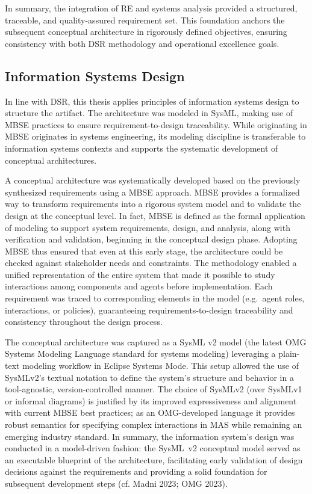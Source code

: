 In summary, the integration of RE and systems analysis provided a structured, traceable, and quality-assured requirement set. This foundation anchors the subsequent conceptual architecture in rigorously defined objectives, ensuring consistency with both DSR methodology and operational excellence goals.

\subsection{Information Systems Design}\label{subsec:isd}
In line with DSR, this thesis applies principles of information systems design to structure the artifact. The architecture was modeled in SysML, making use of MBSE practices to ensure requirement-to-design traceability. While originating in MBSE originates in systems engineering, its modeling discipline is transferable to information systems contexts and supports the systematic development of conceptual architectures.

A conceptual architecture was systematically developed based on the previously synthesized requirements using a MBSE approach. MBSE provides a formalized way to transform requirements into a rigorous system model and to validate the design at the conceptual level. In fact, MBSE is defined as the formal application of modeling to support system requirements, design, and analysis, along with verification and validation, beginning in the conceptual design phase. Adopting MBSE thus ensured that even at this early stage, the architecture could be checked against stakeholder needs and constraints. The methodology enabled a unified representation of the entire system that made it possible to study interactions among components and agents before implementation. Each requirement was traced to corresponding elements in the model (e.g.~agent roles, interactions, or policies), guaranteeing requirements-to-design traceability and consistency throughout the design process.

The conceptual architecture was captured as a SysML v2 model (the latest OMG Systems Modeling Language standard for systems modeling) leveraging a plain-text modeling workflow in Eclipse Systems Mode. This setup allowed the use of SysMLv2's textual notation to define the system's structure and behavior in a tool-agnostic, version-controlled manner. The choice of SysMLv2 (over SysMLv1 or informal diagrams) is justified by its improved expressiveness and alignment with current MBSE best practices; as an OMG-developed language it provides robust semantics for specifying complex interactions in MAS while remaining an emerging industry standard. In summary, the information system's design was conducted in a model-driven fashion: the SysML~v2 conceptual model served as an executable blueprint of the architecture, facilitating early validation of design decisions against the requirements and providing a solid foundation for subsequent development steps (cf. Madni 2023; OMG 2023).

